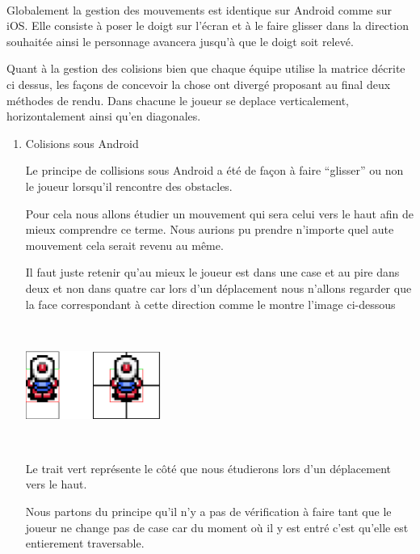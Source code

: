 				$\,$
			
				Globalement la gestion des mouvements est identique sur Android comme sur
				iOS.
				Elle consiste à poser le doigt sur l'écran et à le faire glisser dans la
				direction souhaitée ainsi le personnage avancera jusqu'à que le doigt soit
				relevé.				
				
				Quant à la gestion des colisions bien que chaque équipe utilise la matrice
				décrite ci dessus, les façons de concevoir la chose ont divergé proposant au
				final deux méthodes de rendu.
				Dans chacune le joueur se deplace verticalement, horizontalement ainsi qu'en
				diagonales.
				
				\begin{enumerate}
				  \item Colisions sous Android
				  
				  		Le principe de collisions sous Android a été de façon à faire ``glisser''
				  		ou non le joueur lorsqu'il rencontre des obstacles.
				  		
				  		
				  		Pour cela nous allons étudier un mouvement qui sera celui vers le haut
				  		afin de mieux comprendre ce terme.
				  		Nous aurions pu prendre n'importe quel aute mouvement cela serait revenu
				  		au même.
				  		
				  		Il faut juste retenir qu'au mieux le joueur est dans une case et au pire
				  		dans deux et non dans quatre car lors d'un déplacement nous n'allons
				  		regarder que la face correspondant à cette direction comme le montre
				  		l'image ci-dessous
				  		
				  		$\,$
				  		
						\begin{center}						
							\includegraphics[width=168px,height=84px]{Developpement/Img/ex2.eps}
						\end{center}
						
				  		$\,$				  		
				  		
				  		Le trait vert représente le côté que nous étudierons lors d'un
				  		déplacement vers le haut.
				  		
				  		
				  		Nous partons du principe qu'il n'y a pas de vérification à faire tant
				  		que le joueur ne change pas de case car du moment où il y est entré
				  		c'est qu'elle est entierement traversable.
				  		

\end{enumerate}
